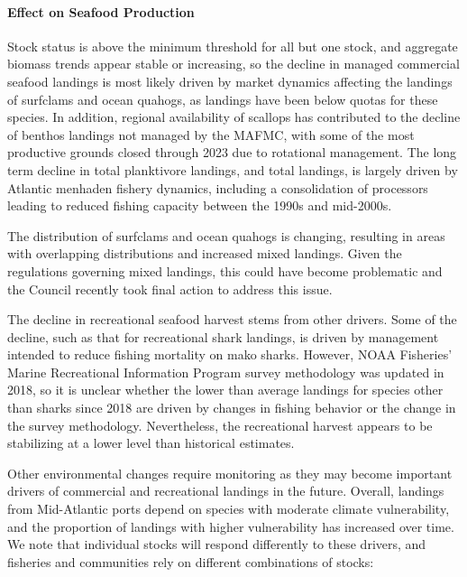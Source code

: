 \documentclass[
  10pt,
]{article}
\begin{document}
\paragraph{Effect on Seafood Production}\label{effect-on-seafood-production}

Stock status is above the minimum threshold for all but one stock, and aggregate biomass trends appear stable or increasing, so the decline in managed commercial seafood landings is most likely driven by market dynamics affecting the landings of surfclams and ocean quahogs, as landings have been below quotas for these species. In addition, regional availability of scallops has contributed to the decline of benthos landings not managed by the MAFMC, with some of the most productive grounds closed through 2023 due to rotational management. The long term decline in total planktivore landings, and total landings, is largely driven by Atlantic menhaden fishery dynamics, including a consolidation of processors leading to reduced fishing capacity between the 1990s and mid-2000s.

The distribution of surfclams and ocean quahogs is changing, resulting in areas with overlapping distributions and increased mixed landings. Given the regulations governing mixed landings, this could have become problematic and the Council recently took final action to address this issue.

The decline in recreational seafood harvest stems from other drivers. Some of the decline, such as that for recreational shark landings, is driven by management intended to reduce fishing mortality on mako sharks. However, NOAA Fisheries' Marine Recreational Information Program survey methodology was updated in 2018, so it is unclear whether the lower than average landings for species other than sharks since 2018 are driven by changes in fishing behavior or the change in the survey methodology. Nevertheless, the recreational harvest appears to be stabilizing at a lower level than historical estimates.

Other environmental changes require monitoring as they may become important drivers of commercial and recreational landings in the future. Overall, landings from Mid-Atlantic ports depend on species with moderate climate vulnerability, and the proportion of landings with higher vulnerability has increased over time. We note that individual stocks will respond differently to these drivers, and fisheries and communities rely on different combinations of stocks:
\end{document}
